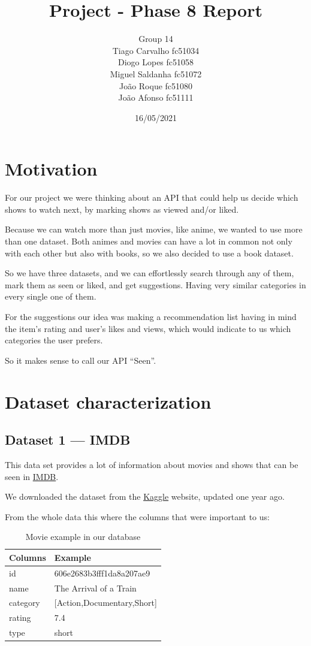 \documentclass{article}
\title{Project - Phase 8 Report}
\author{Group 14 \\
Tiago Carvalho fc51034 \\
Diogo Lopes fc51058 \\
Miguel Saldanha fc51072 \\
João Roque fc51080 \\
João Afonso fc51111 \\
}
\date{16/05/2021}
\newcommand*\fpar{\hspace{1ex}}
\begin{document}
\maketitle

\section{Motivation}
\label{sec:motivation}
\fpar For our project we were thinking about an API that could help us decide which shows to watch next, by marking shows as viewed and/or liked.
\par Because we can watch more than just movies, like anime, we wanted to use more than one dataset. Both animes and movies can have a lot in common not only with each other but also with books, so we also decided to use a book dataset.
\par So we have three datasets, and we can effortlessly search through any of them, mark them as seen or liked, and get suggestions. Having very similar categories in every single one of them.
\par For the suggestions our idea was making a recommendation list having in mind the item's rating and user's likes and views, which would indicate to us which categories the user prefers.
\par So it makes sense to call our API “Seen”.

\section{Dataset characterization}
\label{sec:dataset}
  \subsection{Dataset 1 — IMDB}
  \label{sec:movies}
  \fpar This data set provides a lot of information about movies and shows that can be seen in \href{https://www.imdb.com}{IMDB}.
  \par We downloaded the dataset from the \href{https://www.kaggle.com/ashirwadsangwan/imdb-dataset}{Kaggle} website, updated one year ago.
  \par From the whole data this where the columns that were important to us:
  \begin{table}[H]
    \centering
    \begin{tabular}{l|l}
      Columns & Example                     \\ \hline
      id      & 606e2683b3fff1da8a207ae9    \\
      name    & The Arrival of a Train      \\
      category& [Action,Documentary,Short]  \\
      rating  & 7.4                         \\
      type    & short
    \end{tabular}
    \caption{Movie example in our database}
    \label{table:movie}
  \end{table}
\end{document}
